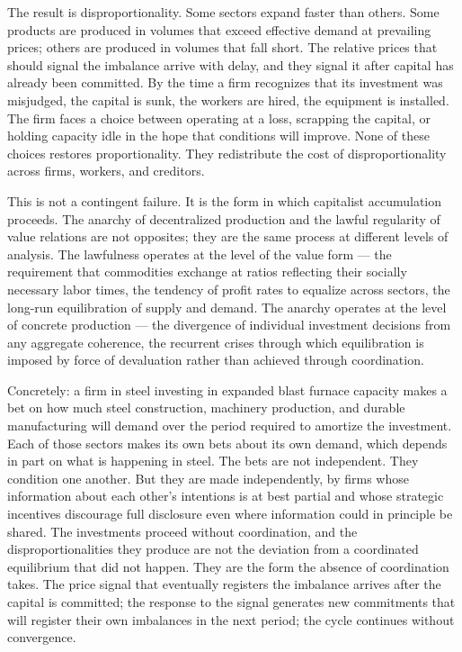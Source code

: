 The result is disproportionality. Some sectors expand faster than others. Some products are produced in volumes that exceed effective demand at prevailing prices; others are produced in volumes that fall short. The relative prices that should signal the imbalance arrive with delay, and they signal it after capital has already been committed. By the time a firm recognizes that its investment was misjudged, the capital is sunk, the workers are hired, the equipment is installed. The firm faces a choice between operating at a loss, scrapping the capital, or holding capacity idle in the hope that conditions will improve. None of these choices restores proportionality. They redistribute the cost of disproportionality across firms, workers, and creditors.

This is not a contingent failure. It is the form in which capitalist accumulation proceeds. The anarchy of decentralized production and the lawful regularity of value relations are not opposites; they are the same process at different levels of analysis. The lawfulness operates at the level of the value form — the requirement that commodities exchange at ratios reflecting their socially necessary labor times, the tendency of profit rates to equalize across sectors, the long-run equilibration of supply and demand. The anarchy operates at the level of concrete production — the divergence of individual investment decisions from any aggregate coherence, the recurrent crises through which equilibration is imposed by force of devaluation rather than achieved through coordination.

Concretely: a firm in steel investing in expanded blast furnace capacity makes a bet on how much steel construction, machinery production, and durable manufacturing will demand over the period required to amortize the investment. Each of those sectors makes its own bets about its own demand, which depends in part on what is happening in steel. The bets are not independent. They condition one another. But they are made independently, by firms whose information about each other's intentions is at best partial and whose strategic incentives discourage full disclosure even where information could in principle be shared. The investments proceed without coordination, and the disproportionalities they produce are not the deviation from a coordinated equilibrium that did not happen. They are the form the absence of coordination takes. The price signal that eventually registers the imbalance arrives after the capital is committed; the response to the signal generates new commitments that will register their own imbalances in the next period; the cycle continues without convergence.

